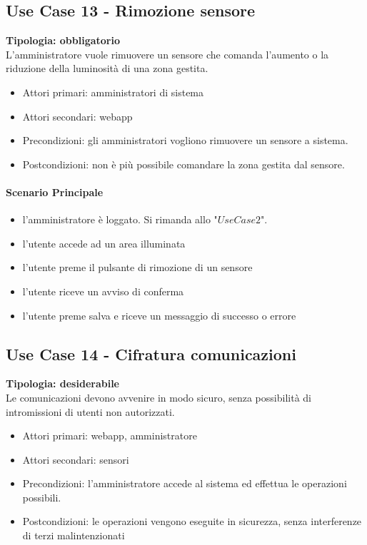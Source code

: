\documentclass[12pt]{article}
\begin{document}
\subsection{Use Case 13 - Rimozione sensore}
\textbf{Tipologia: obbligatorio}\\
L'amministratore vuole rimuovere un sensore che comanda l'aumento o la riduzione della luminosità di una zona gestita.
\begin{itemize}
	\item Attori primari: amministratori di sistema
	\item Attori secondari: webapp
	\item Precondizioni: gli amministratori vogliono rimuovere un sensore a sistema.\\
	\item Postcondizioni: non è più possibile comandare la zona gestita dal sensore.
\end{itemize}
\paragraph{Scenario Principale}
\begin{itemize}
	\item l'amministratore è loggato. Si rimanda allo "$Use Case 2$".
	\item l'utente accede ad un area illuminata
	\item l'utente preme il pulsante di rimozione di un sensore
	\item l'utente riceve un avviso di conferma
	\item l'utente preme salva e riceve un messaggio di successo o errore
\end{itemize}

\subsection{Use Case 14 - Cifratura comunicazioni}
\textbf{Tipologia: desiderabile} \\
Le comunicazioni devono avvenire in modo sicuro, senza possibilità di intromissioni di utenti non autorizzati.
\begin{itemize}
	\item Attori primari: webapp, amministratore
	\item Attori secondari: sensori
	\item Precondizioni: l'amministratore accede al sistema ed effettua le operazioni possibili.
	\item Postcondizioni: le operazioni vengono eseguite in sicurezza, senza interferenze di terzi malintenzionati
\end{itemize}
\end{document}
